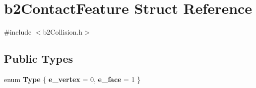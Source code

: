\hypertarget{structb2_contact_feature}{}\section{b2\+Contact\+Feature Struct Reference}
\label{structb2_contact_feature}


{\ttfamily \#include $<$b2\+Collision.\+h$>$}

\subsection*{Public Types}
\begin{DoxyCompactItemize}
\item 
enum {\bfseries Type} \{ {\bfseries e\+\_\+vertex} = 0, 
{\bfseries e\+\_\+face} = 1
 \}\hypertarget{structb2_contact_feature_a29fb037bd886215d2ddd6e68148ac154}{}\label{structb2_contact_feature_a29fb037bd886215d2ddd6e68148ac154}

\end{DoxyCompactItemize}
